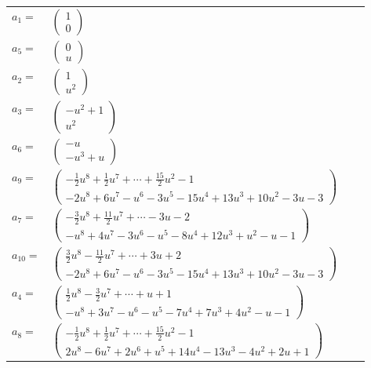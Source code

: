 \documentclass[1p]{elsarticle_modified}
\theoremstyle{definition}
\begin{document}
\begin{tabular}{m{7pt} m{180pt} m{7pt} m{180pt} }
\flushright $a_{1}=$&$\begin{pmatrix}1\\0\end{pmatrix}$ \\
\flushright $a_{5}=$&$\begin{pmatrix}0\\u\end{pmatrix}$ \\
\flushright $a_{2}=$&$\begin{pmatrix}1\\u^2\end{pmatrix}$ \\
\flushright $a_{3}=$&$\begin{pmatrix}- u^2+1\\u^2\end{pmatrix}$ \\
\flushright $a_{6}=$&$\begin{pmatrix}- u\\- u^3+u\end{pmatrix}$ \\
\flushright $a_{9}=$&$\begin{pmatrix}-\frac{1}{2} u^8+\frac{1}{2} u^7+\cdots+\frac{15}{2} u^2-1\\-2 u^8+6 u^7- u^6-3 u^5-15 u^4+13 u^3+10 u^2-3 u-3\end{pmatrix}$ \\
\flushright $a_{7}=$&$\begin{pmatrix}-\frac{3}{2} u^8+\frac{11}{2} u^7+\cdots-3 u-2\\- u^8+4 u^7-3 u^6- u^5-8 u^4+12 u^3+u^2- u-1\end{pmatrix}$ \\
\flushright $a_{10}=$&$\begin{pmatrix}\frac{3}{2} u^8-\frac{11}{2} u^7+\cdots+3 u+2\\-2 u^8+6 u^7- u^6-3 u^5-15 u^4+13 u^3+10 u^2-3 u-3\end{pmatrix}$ \\
\flushright $a_{4}=$&$\begin{pmatrix}\frac{1}{2} u^8-\frac{3}{2} u^7+\cdots+u+1\\- u^8+3 u^7- u^6- u^5-7 u^4+7 u^3+4 u^2- u-1\end{pmatrix}$ \\
\flushright $a_{8}=$&$\begin{pmatrix}-\frac{1}{2} u^8+\frac{1}{2} u^7+\cdots+\frac{15}{2} u^2-1\\2 u^8-6 u^7+2 u^6+u^5+14 u^4-13 u^3-4 u^2+2 u+1\end{pmatrix}$ \\

\end{tabular}
\end{document}
